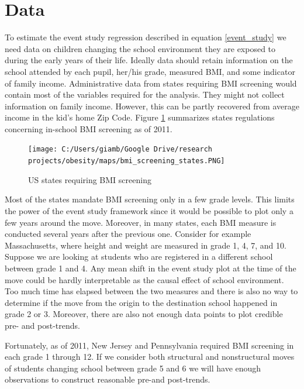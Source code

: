 \documentclass[twoside,12pt]{article}
\begin{document}
\section{Data}
To estimate the event study regression described in equation \ref{event_study} we need data on children changing the school environment they are exposed to during the early years of their life. Ideally data should retain information on the school attended by each pupil, her/his grade, measured BMI, and some indicator of family income. Administrative data from states requiring BMI screening would contain most of the variables required for the analysis. They might not collect information on family income. However, this can be partly recovered from average income in the kid's home Zip Code. Figure \ref{fig:admin_data} summarizes states regulations concerning in-school BMI screening as of 2011. 
\begin{figure}[htp]
  \centering
  \caption{US states requiring BMI screening}
  \label{fig:admin_data}
  \texttt{[image: C:/Users/giamb/Google Drive/research projects/obesity/maps/bmi\_screening\_states.PNG]}
\end{figure}
Most of the states mandate BMI screening only in a few grade levels. This limits the power of the event study framework since it would be possible to plot only a few years around the move. Moreover, in many states, each BMI measure is conducted several years after the previous one. Consider for example Massachusetts, where height and weight are measured in grade 1, 4, 7, and 10. Suppose we are looking at students who are registered in a different school between grade 1 and 4. Any mean shift in the event study plot at the time of the move could be hardly interpretable as the causal effect of school environment. Too much time has elapsed between the two measures and there is also no way to determine if the move from the origin to the destination school happened in grade 2 or 3. Moreover, there are also not enough data points to plot credible pre- and post-trends.   

Fortunately, as of 2011, New Jersey and Pennsylvania required BMI screening in each grade 1 through 12. If we consider both structural and nonstructural moves of students changing school between grade 5 and 6 we will have enough observations to construct reasonable pre-and post-trends. 
\end{document}
